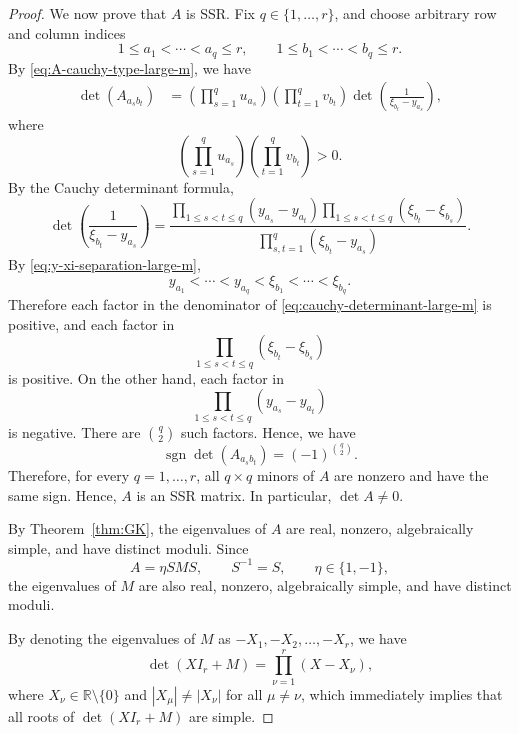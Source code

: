 \documentclass[preprint,3p,10pt]{elsarticle}
\theoremstyle{definition}
\begin{document}
\begin{proof}
We now prove that \(A\) is SSR. Fix \(q\in\{1,\ldots,r\}\), and choose arbitrary
row and column indices
\begin{equation}
    1\le a_1<\cdots<a_q\le r,
    \qquad
    1\le b_1<\cdots<b_q\le r.
\end{equation}
By \eqref{eq:A-cauchy-type-large-m}, we have
\begin{align}
    \det\left(A_{a_s b_t}\right)
    &=
    \left(\prod_{s=1}^{q}u_{a_s}\right)
    \left(\prod_{t=1}^{q}v_{b_t}\right)
    \det\left(
    \frac{1}{\xi_{b_t}-y_{a_s}}
    \right),
\end{align}
where 
\begin{equation}
    \left(\prod_{s=1}^{q}u_{a_s}\right)
    \left(\prod_{t=1}^{q}v_{b_t}\right)>0.
\end{equation}
By the Cauchy determinant formula,
\begin{equation}
    \det\left(
    \frac{1}{\xi_{b_t}-y_{a_s}}
    \right)
    =
    \frac{
    \prod_{1\le s<t\le q}(y_{a_s}-y_{a_t})
    \prod_{1\le s<t\le q}(\xi_{b_t}-\xi_{b_s})
    }{
    \prod_{s,t=1}^{q}(\xi_{b_t}-y_{a_s})
    }.
    \label{eq:cauchy-determinant-large-m}
\end{equation}
By
\eqref{eq:y-xi-separation-large-m},
\begin{equation}
    y_{a_1}<\cdots<y_{a_q}<\xi_{b_1}<\cdots<\xi_{b_q}.
\end{equation}
Therefore each factor in the denominator of
\eqref{eq:cauchy-determinant-large-m} is positive, and each factor in
\begin{equation}
    \prod_{1\le s<t\le q}(\xi_{b_t}-\xi_{b_s})
\end{equation}
is positive. On the other hand, each factor in
\begin{equation}
    \prod_{1\le s<t\le q}(y_{a_s}-y_{a_t})
\end{equation}
is negative. There are \(\binom q2\) such factors. Hence, we have
\begin{equation}
    \operatorname{sgn}
    \det\left(A_{a_s b_t}\right)
    =
    (-1)^{\binom q2}.
\end{equation}
Therefore, for every
\(q=1,\ldots,r\), all \(q\times q\) minors of \(A\) are nonzero and have the
same sign. Hence, \(A\) is an SSR matrix. In particular, \(\det A\neq0\).

By Theorem~\ref{thm:GK}, the eigenvalues of \(A\) are real, nonzero,
algebraically simple, and have distinct moduli. Since
\begin{equation}
    A=\eta SMS,
    \qquad
    S^{-1}=S,
    \qquad
    \eta\in\{1,-1\},
\end{equation}
the eigenvalues of \(M\) are also real, nonzero, algebraically simple, and have distinct moduli.

By denoting the eigenvalues of $M$ as $-X_1, -X_2, \ldots, -X_r$, we have
\begin{equation}
    \det(X I_r+M) = \prod_{\nu=1}^{r}(X -X_\nu),
\end{equation}
where $X_\nu \in \mathbb{R}\setminus\{0\}$ and $|X_\mu| \neq |X_\nu|$ for all $\mu \neq \nu$,
which immediately implies that all roots of $\det(X I_r+M)$ are simple.

\end{proof}
\end{document}
